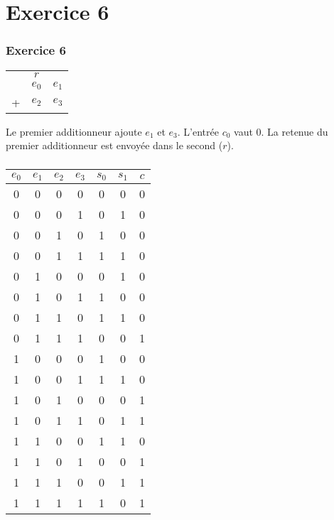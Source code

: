 \documentclass[svgnames,11pt]{beamer}
\begin{document}
\section{Exercice 6}
\begin{frame}
    \frametitle{Exercice 6}
{\Large
    \begin{center}
        \begin{tabular}{ccc}
            &$r$&\\
              & $e_0$ & $e_1$ \\
            + & $e_2$ & $e_3$ \\
        \end{tabular}
    \end{center}
}
Le premier additionneur ajoute $e_1$ et $e_3$. L'entrée $c_0$ vaut 0. La retenue du premier additionneur est envoyée dans le second ($r$).
\end{frame}
\begin{frame}
    \frametitle{}

    \begin{center}
        \begin{tabular}{|*4{c|}|*3{c|}}
        \hline 
        $e_0$ & $e_1$ & $e_2$ & $e_3$ & $s_0$ & $s_1$ & $c$ \\ 
        \hline 
        0 & 0 & 0 & 0 & 0 & 0 & 0 \\ 
        \hline 
        0 & 0 & 0 & 1 & 0 & 1 & 0 \\ 
        \hline
        0 & 0 & 1 & 0 & 1 & 0 & 0 \\ 
        \hline
        0 & 0 & 1 & 1 & 1 & 1 & 0 \\ 
        \hline
        0 & 1 & 0 & 0 & 0 & 1 & 0 \\ 
        \hline
        0 & 1 & 0 & 1 & 1 & 0 & 0 \\ 
        \hline
        0 & 1 & 1 & 0 & 1 & 1 & 0 \\ 
        \hline
        0 & 1 & 1 & 1 & 0 & 0 & 1 \\ 
        \hline
        1 & 0 & 0 & 0 & 1 & 0 & 0 \\ 
        \hline
        1 & 0 & 0 & 1 & 1 & 1 & 0 \\ 
        \hline
        1 & 0 & 1 & 0 & 0 & 0 & 1 \\ 
        \hline
        1 & 0 & 1 & 1 & 0 & 1 & 1 \\ 
        \hline
        1 & 1 & 0 & 0 & 1 & 1 & 0 \\ 
        \hline
        1 & 1 & 0 & 1 & 0 & 0 & 1 \\ 
        \hline
        1 & 1 & 1 & 0 & 0 & 1 & 1 \\ 
        \hline
        1 & 1 & 1 & 1 & 1 & 0 & 1 \\ 
        \hline
        \end{tabular}
        \end{center}

\end{frame}
\end{document}
